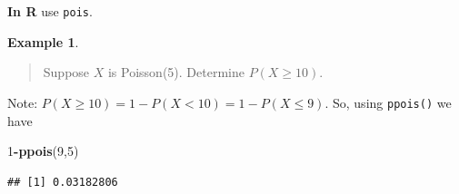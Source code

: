 \documentclass[
]{book}
\newenvironment{Shaded}{\begin{snugshade}}{\end{snugshade}}
\newcommand{\DecValTok}[1]{\textcolor[rgb]{0.00,0.00,0.81}{#1}}
\newcommand{\FunctionTok}[1]{\textcolor[rgb]{0.13,0.29,0.53}{\textbf{#1}}}
\newcommand{\NormalTok}[1]{#1}
\newcommand{\SpecialCharTok}[1]{\textcolor[rgb]{0.81,0.36,0.00}{\textbf{#1}}}
\theoremstyle{definition}
\theoremstyle{definition}
\newtheorem{example}{Example}[chapter]
\theoremstyle{definition}
\theoremstyle{definition}
\theoremstyle{remark}
\begin{document}
\textbf{In R} use \texttt{pois}.

\begin{example}
\protect\hypertarget{exm:poisson-R}{}\label{exm:poisson-R}\leavevmode

\begin{quote}
Suppose \(X\) is Poisson(5). Determine \(P(X \geq 10)\).
\end{quote}

Note: \(P(X \geq 10) = 1-P(X < 10)= 1-P(X \leq 9)\). So, using \texttt{ppois()} we have

\begin{Shaded}
\begin{Highlighting}[]
\DecValTok{1}\SpecialCharTok{{-}}\FunctionTok{ppois}\NormalTok{(}\DecValTok{9}\NormalTok{,}\DecValTok{5}\NormalTok{)}
\end{Highlighting}
\end{Shaded}

\begin{verbatim}
## [1] 0.03182806
\end{verbatim}

\end{example}
\end{document}
